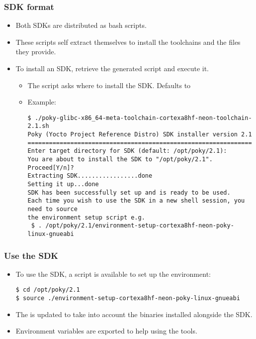 \begin{frame}[fragile]
  \frametitle{SDK format}
  \begin{itemize}
    \item Both SDKs are distributed as bash scripts.
    \item These scripts self extract themselves to install the
      toolchains and the files they provide.
    \item To install an SDK, retrieve the generated script and execute
      it.
      \begin{itemize}
        \item The script asks where to install the SDK. Defaults to
        \item Example: 
        \begin{block}{}
          \begin{verbatim}
$ ./poky-glibc-x86_64-meta-toolchain-cortexa8hf-neon-toolchain-2.1.sh
Poky (Yocto Project Reference Distro) SDK installer version 2.1
===============================================================
Enter target directory for SDK (default: /opt/poky/2.1):
You are about to install the SDK to "/opt/poky/2.1". Proceed[Y/n]?
Extracting SDK.................done
Setting it up...done
SDK has been successfully set up and is ready to be used.
Each time you wish to use the SDK in a new shell session, you need to source
the environment setup script e.g.
 $ . /opt/poky/2.1/environment-setup-cortexa8hf-neon-poky-linux-gnueabi
          \end{verbatim}
        \end{block}
      \end{itemize}
  \end{itemize}
\end{frame}

\begin{frame}[fragile]
  \frametitle{Use the SDK}
  \begin{itemize}
    \item To use the SDK, a script is available to set up the
      environment:
      \begin{block}{}
        \begin{verbatim}
$ cd /opt/poky/2.1
$ source ./environment-setup-cortexa8hf-neon-poky-linux-gnueabi
        \end{verbatim}
      \end{block}
    \item The  is updated to take into account the binaries
      installed alongside the SDK.
    \item Environment variables are exported to help using the tools.
  \end{itemize}
\end{frame}

